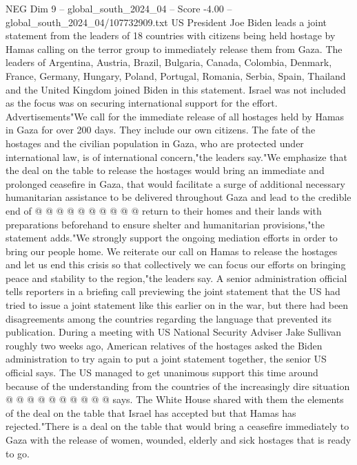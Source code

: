 \begin{textsample}{NEG Dim 9 – global\_south\_2024\_04 – Score -4.00 – global\_south\_2024\_04/107732909.txt}  \label{ex:f9_neg_328}
US President Joe Biden leads a joint statement from the leaders of 18 countries with citizens being held hostage by Hamas calling on the terror group to immediately release them from Gaza.
The leaders of Argentina, Austria, Brazil, Bulgaria, Canada, Colombia, Denmark, France, Germany, Hungary, Poland, Portugal, Romania, Serbia, Spain, Thailand and the United Kingdom joined Biden in this statement.
Israel was not included as the focus was on securing international support for the effort.
Advertisements"We call for the immediate release of all hostages held by Hamas in Gaza for over 200 days.
They include our own citizens.
The fate of the hostages and the civilian population in Gaza, who are protected under international law, is of international concern,"the leaders say."We emphasize that the deal on the table to release the hostages would bring an immediate and prolonged ceasefire in Gaza, that would facilitate a surge of additional necessary humanitarian assistance to be delivered throughout Gaza and lead to the credible end of @ @ @ @ @ @ @ @ @ @ return to their homes and their lands with preparations beforehand to ensure shelter and humanitarian provisions,"the statement adds."We strongly support the ongoing mediation efforts in order to bring our people home.
We reiterate our call on Hamas to release the hostages and let us end this crisis so that collectively we can focus our efforts on bringing peace and stability to the region,"the leaders say.
A senior administration official tells reporters in a briefing call previewing the joint statement that the US had tried to issue a joint statement like this earlier on in the war, but there had been disagreements among the countries regarding the language that prevented its publication.
During a meeting with US National Security Adviser Jake Sullivan roughly two weeks ago, American relatives of the hostages asked the Biden administration to try again to put a joint statement together, the senior US official says.
The US managed to get unanimous support this time around because of the understanding from the countries of the increasingly dire situation @ @ @ @ @ @ @ @ @ @ says.
The White House shared with them the elements of the deal on the table that Israel has accepted but that Hamas has rejected."There is a deal on the table that would bring a ceasefire immediately to Gaza with the release of women, wounded, elderly and sick hostages that is ready to go.

\end{textsample}
